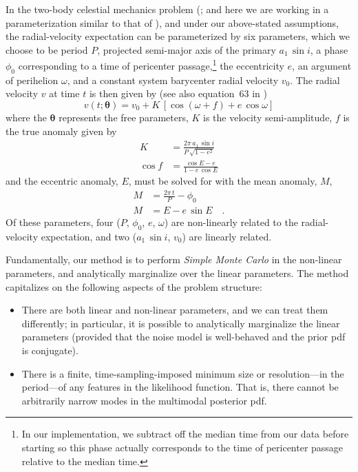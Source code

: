 \documentclass[manuscript, letterpaper]{aastex6}
\newcommand{\asini}{\ensuremath{a_1\,\sin i}}
\newcommand{\bs}[1]{\boldsymbol{#1}}
\begin{document}
In the two-body celestial mechanics problem (\citealt{Kepler:1609}; and here we
are working in a parameterization similar to that of \citealt{Murray:2010}), and
under our above-stated assumptions, the radial-velocity expectation can be
parameterized by six parameters, which we choose to be period $P$, projected
semi-major axis of the primary $\asini$, a phase $\phi_0$ corresponding to a
time of pericenter passage,\footnote{In our implementation, we subtract off the
median time from our data before starting so this phase actually corresponds to
the time of pericenter passage relative to the median time.} the eccentricity
$e$, an argument of perihelion $\omega$, and a constant system barycenter radial
velocity $v_0$.
The radial velocity $v$ at time $t$ is then given by (see also
equation~63 in \citealt{Murray:2010})
\begin{equation}
  v(t;\bs{\theta}) = v_0 + K\,[\cos(\omega + f) + e\,\cos\omega]
\end{equation}
where the $\bs{\theta}$ represents the free parameters, $K$ is the velocity
semi-amplitude, $f$ is the true anomaly given by
\begin{align}
  K &= \frac{2\pi\,\asini}{P\,\sqrt{1-e^2}}\\
  \cos f &= \frac{\cos E - e}{1 - e\, \cos E}
\end{align}
and the eccentric anomaly, $E$, must be solved for with the mean
anomaly, $M$,
\begin{align}
  M &= \frac{2\pi\, t}{P} - \phi_0\\
  M &= E - e\,\sin E \quad .
\end{align}
Of these parameters, four ($P$, $\phi_0$, $e$, $\omega$) are
non-linearly related to the radial-velocity expectation, and two
($\asini$, $v_0$) are linearly related.

Fundamentally, our method is to perform \emph{Simple Monte Carlo} in
the non-linear parameters, and analytically marginalize over the linear
parameters.
The method capitalizes on the following aspects of the problem
structure:
\begin{itemize}\itemsep0ex
\item There are both linear and non-linear parameters, and we can
  treat them differently; in particular, it is possible to
  analytically marginalize the linear parameters (provided that the
  noise model is well-behaved and the prior pdf is conjugate).
\item There is a finite, time-sampling-imposed minimum size or
  resolution---in the period---of any features in the
  likelihood function. That is, there cannot be arbitrarily narrow
  modes in the multimodal posterior pdf.
\end{itemize}
\end{document}
